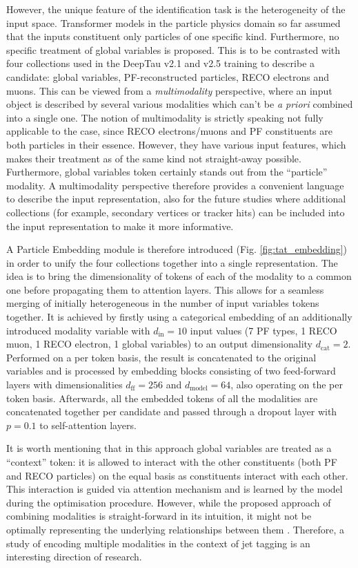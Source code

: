However, the unique feature of the \tauh identification task is the heterogeneity of the input space. Transformer models in the particle physics domain so far assumed that the inputs constituent only particles of one specific kind. Furthermore, no specific treatment of global variables is proposed. This is to be contrasted with four collections used in the DeepTau v2.1 and v2.5 training to describe a \tauh candidate: global variables, PF-reconstructed particles, RECO electrons and muons. This can be viewed from a \textit{multimodality} perspective, where an input object is described by several various modalities which can't be \textit{a priori} combined into a single one. The notion of multimodality is strictly speaking not fully applicable to the \tauh case, since RECO electrons/muons and PF constituents are both particles in their essence. However, they have various input features, which makes their treatment as of the same kind not straight-away possible. Furthermore, global variables token certainly stands out from the \enquote{particle} modality. A multimodality perspective therefore provides a convenient language to describe the input \tauh representation, also for the future studies where additional collections (for example, secondary vertices or tracker hits) can be included into the input representation to make it more informative.  

A Particle Embedding module is therefore introduced (Fig. \ref{fig:tat_embedding}) in order to unify the four collections together into a single representation. The idea is to bring the dimensionality of tokens of each of the modality to a common one before propagating them to attention layers. This allows for a seamless merging of initially heterogeneous in the number of input variables tokens together. It is achieved by firstly using a categorical embedding of an additionally introduced modality variable with $d_\text{in}=10$ input values (7 PF types, 1 RECO muon, 1 RECO electron, 1 global variables) to an output dimensionality $d_\text{cat}=2$. Performed on a per token basis, the result is concatenated to the original variables and is processed by embedding blocks consisting of two feed-forward layers with dimensionalities $d_\text{ff}=256$ and $d_\text{model}=64$, also operating on the per token basis. Afterwards, all the embedded tokens of all the modalities are concatenated together per \tauh candidate and passed through a dropout layer with $p=0.1$ to self-attention layers.

It is worth mentioning that in this approach global variables are treated as a \enquote{context} token: it is allowed to interact with the other constituents (both PF and RECO particles) on the equal basis as constituents interact with each other. This interaction is guided via attention mechanism and is learned by the model during the optimisation procedure. However, while the proposed approach of combining modalities is straight-forward in its intuition, it might not be optimally representing the underlying relationships between them \cite{xu2022multimodal}. Therefore, a study of encoding multiple modalities in the context of jet tagging is an interesting direction of research.   

